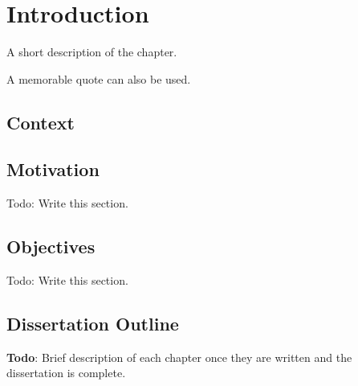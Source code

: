 \chapter{Introduction}%
\label{chapter:introduction}

\begin{introduction}
A short description of the chapter.

A memorable quote can also be used.
\end{introduction}


\section{Context}

\section{Motivation}

Todo: Write this section.

\section{Objectives}

Todo: Write this section.

\section{Dissertation Outline}

\textbf{Todo}: Brief description of each chapter once they are written and the dissertation is complete.
